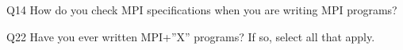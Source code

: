 \begin{description}%
\item{Q14} How do you check MPI specifications when you are writing MPI programs?%
\item{Q22} Have you ever written MPI+”X” programs? If so, select all that apply.%
\end{description}%
